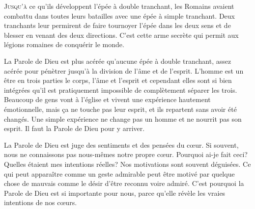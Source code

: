 


\lettrine{J}{usqu'à} ce qu'ils développent l'épée à double tranchant,
 les Romains avaient combattu dans toutes leurs batailles avec une épée
 à simple tranchant. Deux tranchants leur permirent de faire tournoyer
 l'épée dans les deux sens et de blesser en venant des deux directions.
 C'est cette arme secrète qui permit aux légions romaines 
 de conquérir le monde. 


La Parole de Dieu est plus acérée qu'aucune épée à double tranchant,
 assez acérée pour pénètrer jusqu'à la division de l'âme et de l'esprit.
 L'homme est un être en trois parties
 \ocadr le corps, l'âme et l'esprit \fcadr{}
 et cependant elles sont si bien intégrées qu'il est pratiquement impossible
 de complètement séparer les trois.
 Beaucoup de gens vont à l'église et vivent une expérience hautement
 émotionnelle, mais \c{c}a ne touche pas leur esprit, et ils repartent
 sans avoir été changés.
 Une simple expérience ne change pas un homme et ne nourrit pas son esprit.
 Il faut la Parole de Dieu pour y arriver. 

La Parole de Dieu est juge des sentiments et des pensées du c\oe{}ur.
 Si souvent, nous ne connaissons pas nous-mêmes notre propre c\oe{}ur.
 Pourquoi ai-je fait ceci? Quelles étaient mes intentions réelles?
 Nos motivations sont souvent déguisées.
 Ce qui peut apparaître comme un geste admirable peut être motivé
 par quelque chose de mauvais \ocadr comme le désir d'être reconnu
 voire admiré. C'est pourquoi la Parole de Dieu est si importante pour nous,
 parce qu'elle révèle les vraies intentions de nos c\oe{}urs. 

\dvrule





